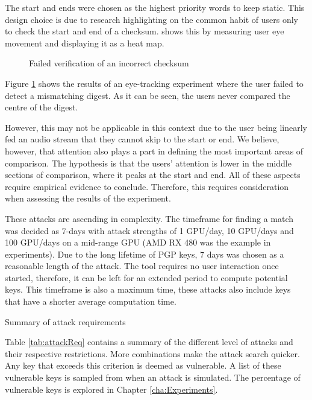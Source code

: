The start and ends were chosen as the highest priority words to keep static. This design choice is due to research highlighting on the common habit of users only to check the start and end of a checksum. \cite{cherubini2018towards} shows this by measuring user eye movement and displaying it as a heat map.

\begin{figure}[h!]
    \centering
    \caption{Failed verification of an incorrect checksum\cite{cherubini2018towards}}
    \label{fig:heatMap}
\end{figure}

Figure \ref{fig:heatMap} shows the results of an eye-tracking experiment where the user failed to detect a mismatching digest. As it can be seen, the users never compared the centre of the digest. 

However, this may not be applicable in this context due to the user being linearly fed an audio stream that they cannot skip to the start or end. We believe, however, that attention also plays a part in defining the most important areas of comparison. The hypothesis is that the users' attention is lower in the middle sections of comparison, where it peaks at the start and end. All of these aspects require empirical evidence to conclude. Therefore, this requires consideration when assessing the results of the experiment.

These attacks are ascending in complexity. The timeframe for finding a match was decided as 7-days with attack strengths of 1 GPU/day, 10 GPU/days and 100 GPU/days on a mid-range GPU (AMD RX 480 was the example in experiments). Due to the long lifetime of PGP keys, 7 days was chosen as a reasonable length of the attack. The tool requires no user interaction once started, therefore, it can be left for an extended period to compute potential keys. This timeframe is also a maximum time, these attacks also include keys that have a shorter average computation time.

\begin{table}[h!]
    \centering
    
    \caption{Summary of attack requirements}
    \label{tab:attackReq}
\end{table}

Table \ref{tab:attackReq} contains a summary of the different level of attacks and their respective restrictions. More combinations make the attack search quicker. Any key that exceeds this criterion is deemed as vulnerable. A list of these vulnerable keys is sampled from when an attack is simulated. The percentage of vulnerable keys is explored in Chapter \ref{cha:Experiments}.

